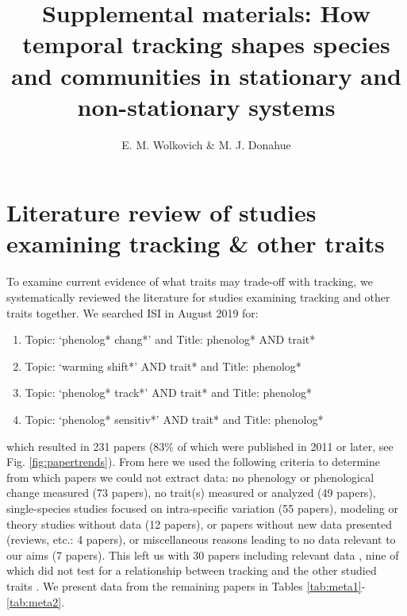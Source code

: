 \documentclass[11pt,letter]{article}
\begin{document}
\renewcommand{\refname}{\CHead{}}

\title{Supplemental materials:  How temporal tracking shapes species and communities in stationary and non-stationary systems} 

\author{E. M. Wolkovich \& M. J. Donahue}
\date{} 
\maketitle  %
\renewcommand{\thetable}{S\arabic{table}}
\renewcommand{\thefigure}{S\arabic{figure}}


\section{Literature review of studies examining tracking \& other traits}
To examine current evidence of what traits may trade-off with tracking, we systematically reviewed the literature for studies examining tracking and other traits together. We searched ISI in August 2019 for:
\begin{enumerate}
\item Topic: `phenolog* chang*' and Title: phenolog* AND trait*
\item Topic: `warming shift*' AND trait* and Title: phenolog*
\item Topic: `phenolog* track*' AND trait* and Title: phenolog*
\item Topic: `phenolog* sensitiv*' AND trait* and Title: phenolog*
\end{enumerate}
which resulted in 231 papers (83\% of which were published in 2011 or later, see Fig. \ref{fig:papertrends}). From here we used the following criteria to determine from which papers we could not extract data: no phenology or phenological change measured (73 papers), no trait(s) measured or analyzed (49 papers), single-species studies focused on intra-specific variation (55 papers), modeling or theory studies without data (12 papers), or papers without new data presented (reviews, etc.: 4 papers), or miscellaneous reasons leading to no data relevant to our aims (7 papers). This left us with 30 papers including relevant data \citep{Suzuki:1997gf,Post1999,adrian2006,Xu:2009an,Goodenough2010,Diamond:2011nx,Moussus2011,Szilvia2012,Dorji2013,Ishioka2013,xia2013,Bock2014,kharouba2014,Vegvari2015,bell2015,jing2016,lasky2016,McDermott2016,Zhu2016BioLetters,brooks2017,du2017,munson2017,arfinkhan2018,zhang2018,Ladwig2019,park2019,sharma2019,Xavier2019,Zettlemoyer2019}, nine of which did not test for a relationship between tracking and the other studied traits \citep{Suzuki:1997gf,adrian2006,Xu:2009an,Szilvia2012,bell2015,McDermott2016,Sherwood2017,sharma2019,Xavier2019}. We present data from the remaining papers in Tables \ref{tab:meta1}-\ref{tab:meta2}. \\
\end{document}
